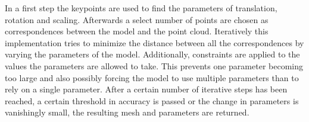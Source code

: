 In a first step the keypoints are used to find the parameters of translation, rotation and scaling. Afterwards a select number of points are chosen as correspondences between the model and the point cloud. Iteratively this implementation tries to minimize the distance between all the correspondences by varying the parameters of the model. Additionally, constraints are applied to the values the parameters are allowed to take. This prevents one parameter becoming too large and also possibly forcing the model to use multiple parameters than to rely on a single parameter. After a certain number of iterative steps has been reached, a certain threshold in accuracy is passed or the change in parameters is vanishingly small, the resulting mesh and parameters are returned.
